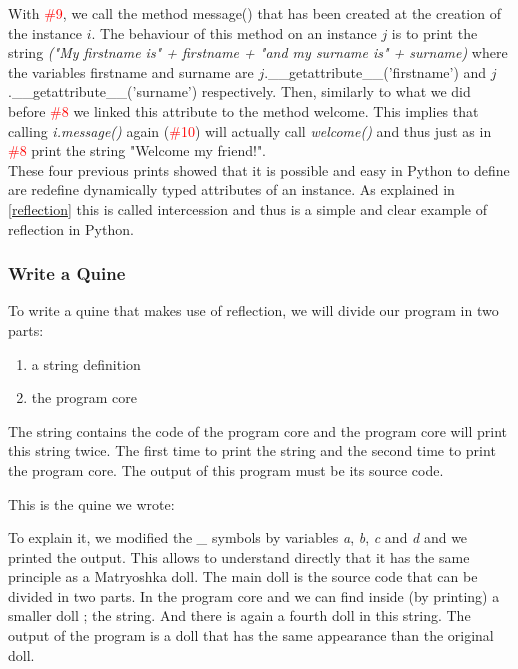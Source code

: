 With \textcolor{red}{\#9}, we call the method message() that has been created at the creation of the instance $i$. The behaviour of this method on an instance $j$ is to print the string \emph{("My firstname is" + firstname + "and my surname is" + surname)} where the variables firstname and surname are $j$.\_\_getattribute\_\_(’firstname’) and $j$.\_\_getattribute\_\_(’surname’) respectively. Then, similarly to what we did before \textcolor{red}{\#8} we linked this attribute to the method welcome. This implies that calling \emph{i.message()} again (\textcolor{red}{\#10}) will actually call \emph{welcome()} and thus just as in \textcolor{red}{\#8} print the string "Welcome my friend!".\\

These four previous prints showed that it is possible and easy in Python to define are redefine dynamically typed attributes of an instance. As explained in \ref{reflection} this is called intercession and thus is a  simple and clear example of reflection in Python.\\

\subsubsection{Write a Quine}
To write a quine that makes use of reflection, we will divide our program in two parts:
\begin{enumerate}
    \item a string definition
    \item the program core
\end{enumerate}
The string contains the code of the program core and the program core will print this string twice. The first time to print the string and the second time to print the program core. The output of this program must be its source code.

This is the quine we wrote:


To explain it, we modified the \emph{\_} symbols by variables \emph{a}, \emph{b}, \emph{c} and \emph{d} and we printed the output. This allows to understand directly that it has the same principle as a Matryoshka doll. The main doll is the source code that can be divided in two parts. In the program core and we can find inside (by printing) a smaller doll ; the string. And there is again a fourth doll in this string. The output of the program is a doll that has the same appearance than the original doll.


